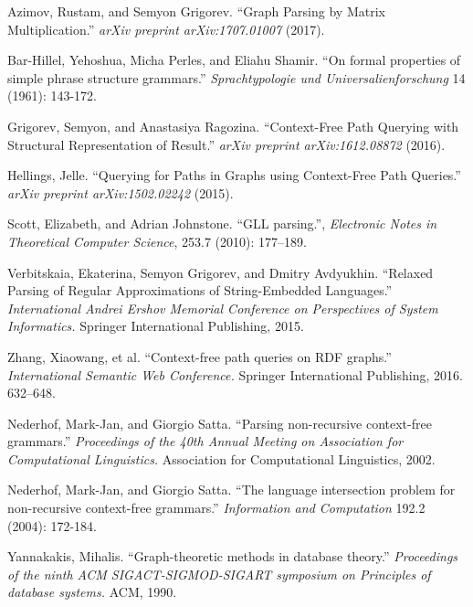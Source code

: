 \documentclass{vldb}
\begin{document}
\begin{thebibliography}{9}

   Azimov, Rustam, and Semyon Grigorev.
   ``Graph Parsing by Matrix Multiplication.''
   \emph{arXiv preprint arXiv:1707.01007}
   (2017).

   Bar-Hillel, Yehoshua, Micha Perles, and Eliahu Shamir.
   ``On formal properties of simple phrase structure grammars.''
   \emph{Sprachtypologie und Universalienforschung}
   14 (1961): 143-172.

  Grigorev, Semyon, and Anastasiya Ragozina. 
  ``Context-Free Path Querying with Structural Representation of Result.''
   \emph{arXiv preprint arXiv:1612.08872}
    (2016).

  Hellings, Jelle.
  ``Querying for Paths in Graphs using Context-Free Path Queries.''
  \emph{arXiv preprint arXiv:1502.02242} (2015).

  Scott, Elizabeth, and Adrian Johnstone.   
  ``GLL parsing.'',
  \emph{Electronic Notes in Theoretical Computer Science},
  253.7 (2010): 177--189.

  Verbitskaia, Ekaterina, Semyon Grigorev, and Dmitry Avdyukhin.
  ``Relaxed Parsing of Regular Approximations of String-Embedded Languages.''
  \emph{International Andrei Ershov Memorial Conference on Perspectives of System Informatics.}
  Springer International Publishing, 2015.

  Zhang, Xiaowang, et al.
  ``Context-free path queries on RDF graphs.'' 
  \emph{International Semantic Web Conference.}
   Springer International Publishing, 2016.
   632--648.

  Nederhof, Mark-Jan, and Giorgio Satta.
  ``Parsing non-recursive context-free grammars.''
  \emph{Proceedings of the 40th Annual Meeting on Association for Computational Linguistics.}
  Association for Computational Linguistics, 2002.

  Nederhof, Mark-Jan, and Giorgio Satta.
  ``The language intersection problem for non-recursive context-free grammars.''
  \emph{Information and Computation} 192.2 (2004): 172-184.

  Yannakakis, Mihalis.
  ``Graph-theoretic methods in database theory.''
  \emph{Proceedings of the ninth ACM SIGACT-SIGMOD-SIGART symposium on Principles of database systems.}
   ACM, 1990.

\end{thebibliography}
\end{document}
